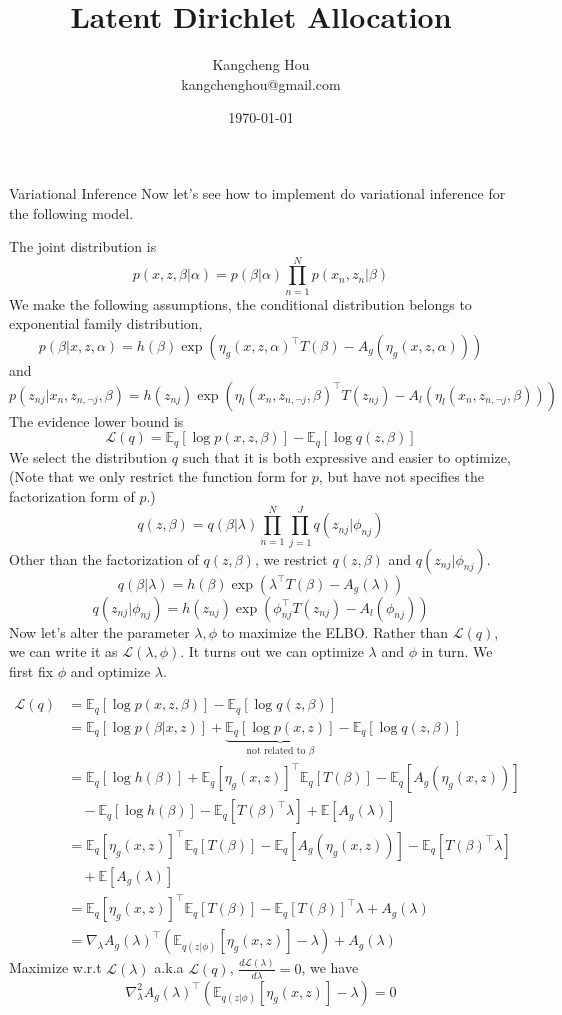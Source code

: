\documentclass{beamer}
\title{Latent Dirichlet Allocation}
\author{Kangcheng Hou\\kangchenghou@gmail.com}
\institute{Zhejiang University}
\date{\today}
\begin{document}
    
\frame{\titlepage}

 

\begin{frame}[allowframebreaks]{Variational Inference}
Now let's see how to implement do variational inference for the following model.

The joint distribution is 
$$p(x,z,\beta | \alpha)=p(\beta | \alpha)\prod_{n=1}^N p(x_n,z_n | \beta)$$
We make the following assumptions, the conditional distribution belongs to exponential family distribution,
$$p(\beta | x,z,\alpha)=h(\beta)\exp(\eta_g (x,z,\alpha)^\top T(\beta)-A_g(\eta_g(x,z,\alpha)))$$
and
$$\scriptstyle p(z_{nj}|x_n,z_{n,\neg j},\beta)=h(z_{nj})\exp(\eta_l(x_n,z_{n,\neg j},\beta)^\top T(z_{nj})-A_l(\eta_l(x_n,z_{n,\neg j},\beta)))$$
The evidence lower bound is
$$\mathcal{L}(q)=\mathbb{E}_q[\log p(x,z,\beta)]-\mathbb{E}_q[\log q(z,\beta)]$$
We select the distribution $q$ such that it is both expressive and easier to optimize, (Note that we only restrict the function form for $p$, but have not specifies the factorization form of $p$.)
$$q(z,\beta)=q(\beta|\lambda)\prod_{n=1}^N \prod_{j=1}^J q(z_{nj}|\phi_{nj})$$
Other than the factorization of $q(z,\beta)$, we restrict $q(z, \beta)$ and $q(z_{nj} | \phi_{nj})$.
$$q(\beta | \lambda)=h(\beta)\exp(\lambda^\top T(\beta)-A_g(\lambda))$$
$$q(z_{nj}|\phi_{nj})=h(z_{nj})\exp(\phi_{nj}^\top T(z_{nj})-A_l(\phi_{nj}))$$
Now let's alter the parameter $\lambda, \phi$ to maximize the ELBO.
Rather than $\mathcal{L}(q)$, we can write it as $\mathcal{L}(\lambda, \phi)$.
It turns out we can optimize $\lambda$ and $\phi$ in turn.  We first fix $\phi$ and optimize $\lambda$. 

\begin{align*}
\mathcal{L}(q)& =\mathbb{E}_q[\log p(x,z,\beta)]-\mathbb{E}_q[\log q(z,\beta)] \\
& = \mathbb{E}_q[\log p(\beta | x,z)] + \underbrace{\mathbb{E}_q[\log p(x,z)]}_{\text{not related to }\beta}-\mathbb{E}_q[\log q(z,\beta)] \\
& = \mathbb{E}_q[\log h(\beta)] + \mathbb{E}_q[\eta_g (x,z)]^\top \mathbb{E}_q[T(\beta)]-\mathbb{E}_q[A_g(\eta_g(x,z))]  \\ 
& \quad  - \mathbb{E}_q[\log h(\beta)] - \mathbb{E}_q[T(\beta)^\top \lambda] +  \mathbb{E}[A_g(\lambda)] \\
& = \mathbb{E}_q[\eta_g (x,z)]^\top\mathbb{E}_q[T(\beta)]-\mathbb{E}_q[A_g(\eta_g(x,z))] - \mathbb{E}_q[T(\beta)^\top \lambda] \\ 
& \quad + \mathbb{E}[A_g(\lambda)] \\ 
& = \mathbb{E}_q[\eta_g (x,z)]^\top\mathbb{E}_q[T(\beta)] - \mathbb{E}_q[T(\beta)]^\top\lambda + A_g(\lambda) \\
& = \nabla_\lambda A_g(\lambda)^\top(\mathbb{E}_{q(z | \phi)}[\eta_g (x,z)] - \lambda) + A_g(\lambda)
\end{align*}
Maximize w.r.t $\mathcal{L}(\lambda)$ a.k.a $\mathcal{L}(q)$, $\frac{d\mathcal{L}(\lambda)}{d \lambda} = 0$, we have 
$$\nabla^2_\lambda A_g(\lambda)^\top(\mathbb{E}_{q(z | \phi)}[\eta_g (x,z)] - \lambda) = 0$$


\end{frame}
\end{document}

